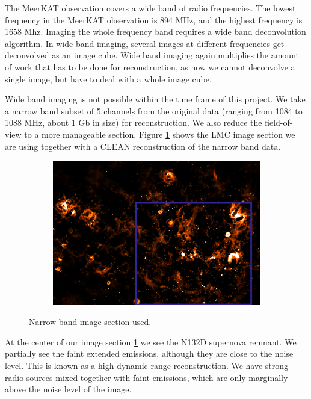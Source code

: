 The MeerKAT observation covers a wide band of radio frequencies. The lowest frequency in the MeerKAT observation is 894 MHz, and the highest frequency is 1658 Mhz.
Imaging the whole frequency band requires a wide band deconvolution algorithm. In wide band imaging, several images at different frequencies get deconvolved as an image cube. Wide band imaging again multiplies the amount of work that has to be done for reconstruction, as now we cannot deconvolve a single image, but have to deal with a whole image cube.

Wide band imaging is not possible within the time frame of this project. We take a narrow band subset of 5 channels from the original data (ranging from 1084 to 1088 MHz, about 1 Gb in size) for reconstruction. We also reduce the field-of-view to a more manageable section. Figure \ref{results:cutout} shows the LMC image section we are using together with a CLEAN reconstruction of the narrow band data.

\begin{figure}[h]
	\centering
	\begin{subfigure}[b]{0.4\linewidth}
		\includegraphics[width=1.0\linewidth]{./chapters/10.results/LMC/meerkat_cutout.png}
	\end{subfigure}
	\begin{subfigure}[b]{0.28\linewidth}
	\end{subfigure}
	\caption{Narrow band image section used.}
	\label{results:cutout}
\end{figure}

At the center of our image section \ref{results:cutout} we see the N132D supernova remnant. We partially see the faint extended emissions, although they are close to the noise level. This is known as a high-dynamic range reconstruction. We have strong radio sources mixed together with faint emissions, which are only marginally above the noise level of the image.

